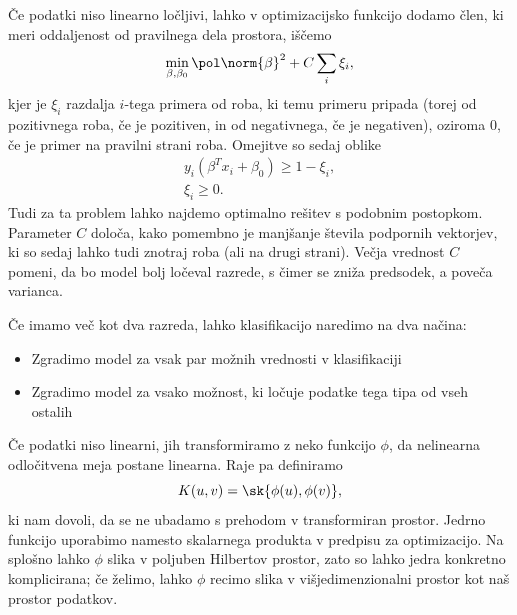 Če podatki niso linearno ločljivi, lahko v optimizacijsko funkcijo dodamo člen,
ki meri oddaljenost od pravilnega dela prostora, iščemo
\[
  \min_{\beta, \beta_0} \pol \norm{\beta}^2 + C \sum_i \xi_i,
\]
kjer je $\xi_i$ razdalja $i$-tega primera od roba, ki temu primeru pripada
(torej od pozitivnega roba, če je pozitiven, in od negativnega, če je
negativen), oziroma $0$, če je primer na pravilni strani roba.
Omejitve so sedaj oblike
\begin{gather*}
  y_i (\beta^T x_i + \beta_0) \ge 1 - \xi_i, \\
  \xi_i \ge 0.
\end{gather*}
Tudi za ta problem lahko najdemo optimalno rešitev s podobnim postopkom.
Parameter $C$ določa, kako pomembno je manjšanje števila podpornih vektorjev, ki
so sedaj lahko tudi znotraj roba (ali na drugi strani).
Večja vrednost $C$ pomeni, da bo model bolj ločeval razrede, s čimer se zniža
predsodek, a poveča varianca.


Če imamo več kot dva razreda, lahko klasifikacijo naredimo na dva načina:
\begin{itemize}
\item Zgradimo model za vsak par možnih vrednosti v klasifikaciji
\item Zgradimo model za vsako možnost, ki ločuje podatke tega tipa od vseh ostalih
\end{itemize}

Če podatki niso linearni, jih transformiramo z neko funkcijo $\phi$, da
nelinearna odločitvena meja postane linearna.
Raje pa definiramo
\[
  K(u,v) = \sk{\phi(u), \phi(v)},
\]
ki nam dovoli, da se ne ubadamo s prehodom v transformiran prostor.
Jedrno funkcijo uporabimo namesto skalarnega produkta v predpisu za optimizacijo.
Na splošno lahko $\phi$ slika v poljuben Hilbertov prostor, zato so lahko jedra
konkretno komplicirana; če želimo, lahko $\phi$ recimo slika v
višjedimenzionalni prostor kot naš prostor podatkov.


